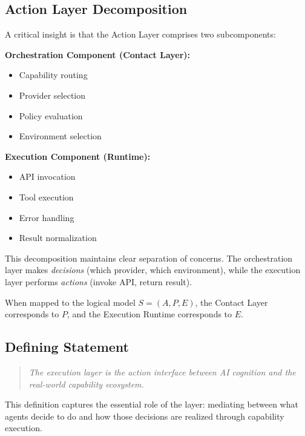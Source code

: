 \subsection{Action Layer Decomposition}

A critical insight is that the Action Layer comprises two subcomponents:

\textbf{Orchestration Component (Contact Layer):}
\begin{itemize}[leftmargin=1.5em,nosep]
  \item Capability routing
  \item Provider selection
  \item Policy evaluation
  \item Environment selection
\end{itemize}

\textbf{Execution Component (Runtime):}
\begin{itemize}[leftmargin=1.5em,nosep]
  \item API invocation
  \item Tool execution
  \item Error handling
  \item Result normalization
\end{itemize}

This decomposition maintains clear separation of concerns. The orchestration layer makes \emph{decisions} (which provider, which environment), while the execution layer performs \emph{actions} (invoke API, return result).

When mapped to the logical model $S = (A, P, E)$, the Contact Layer corresponds to $P$, and the Execution Runtime corresponds to $E$.

\subsection{Defining Statement}

\begin{quote}
\emph{The execution layer is the action interface between AI cognition and the real-world capability ecosystem.}
\end{quote}

This definition captures the essential role of the layer: mediating between what agents decide to do and how those decisions are realized through capability execution.
